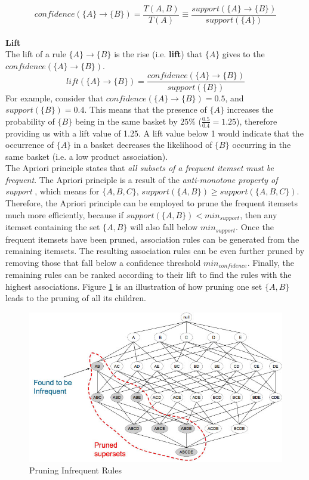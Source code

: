 \documentclass[paper=a4,fontsize=11pt]{report}	%
\newcommand{\setA}{\{A\}}
\newcommand{\setB}{\{B\}}
\newcommand{\abrule}{\setA\rightarrow\setB}
\begin{document}
\[
\textit{confidence}(\abrule) = \frac{T(A, B)}{T(A)} \equiv \frac{\textit{support}(\abrule)}{\textit{support}(\setA)}
\]
\\\textbf{Lift}\\
The lift of a rule $\abrule$ is the rise (i.e. \textbf{lift}) that $\setA$ gives to the $\textit{confidence}(\abrule)$.
\[
\textit{lift}(\abrule) = \frac{confidence(\abrule)}{support(\setB)}
\]
For example, consider that $\textit{confidence}(\abrule)=0.5$, and $\textit{support}(\setB)=0.4.$ This means that the presence of $\setA$ increases the probability of $\setB$ being in the same basket by $25\%$ ($\frac{0.5}{0.4}=1.25$), therefore providing us with a lift value of 1.25.  A lift value below 1 would indicate that the occurrence of $\setA$ in a basket decreases the likelihood of $\setB$ occurring in the same basket (i.e. a low product association).
\\
The Apriori principle states that \textit{all subsets of a frequent itemset must be frequent}.  The Apriori principle is a result of the \textit{anti-monotone property of support} \cite{anti_monotone}, which means for $\{A,B,C\}$, $\textit{support}(\{A,B\}) \geq \textit{support}(\{A,B,C\})$.  Therefore, the Apriori principle can be employed to prune the frequent itemsets much more efficiently, because if $support(\{A,B\}) < \textit{min}_{\textit{support}}$, then any itemset containing the set $\{A,B\}$ will also fall below $\textit{min}_{\textit{support}}$. Once the frequent itemsets have been pruned,  association rules can be generated from the remaining itemsets.  The resulting association rules can be even further pruned by removing those that fall below a confidence threshold $\textit{min}_{\textit{confidence}}$.  Finally, the remaining rules can be ranked according to their  lift to find the rules with the highest associations.  Figure \ref{fig:prune} is an illustration of how pruning one set $\{A, B\}$ leads to the pruning of all its children.

\begin{figure}[H]\centering
\includegraphics[scale=0.5]{apriori-prune}	
\caption{Pruning Infrequent Rules \cite{apriori-prune}}
\label{fig:prune}
\end{figure}
\end{document}
